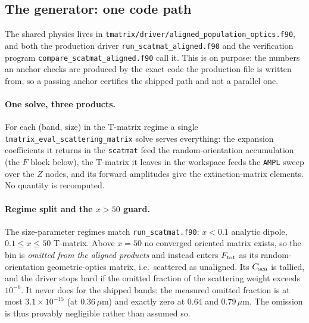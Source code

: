 \documentclass{my_memo}
\newcommand{\code}[1]{\texttt{#1}}
\newcommand{\um}{\ensuremath{\,\mu\mathrm{m}}}
\begin{document}
\subsection{The generator: one code path}\label{sec:aligned:gen}

The shared physics lives in \code{tmatrix/driver/aligned\_population\_optics.f90},
and both the production driver \code{run\_scatmat\_aligned.f90} and the
verification program \code{compare\_scatmat\_aligned.f90} call it. This is on
purpose: the numbers an anchor checks are produced by the exact code the
production file is written from, so a passing anchor certifies the shipped path
and not a parallel one.

\paragraph{One solve, three products.} For each (band, size) in the T-matrix
regime a single \code{tmatrix\_eval\_scattering\_matrix} solve serves everything:
the expansion coefficients it returns in the \code{scatmat} feed the
random-orientation accumulation (the $F$ block below), the T-matrix it leaves in
the workspace feeds the \code{AMPL} sweep over the
$Z$ nodes, and its forward amplitudes give the extinction-matrix elements. No
quantity is recomputed.

\paragraph{Regime split and the $x>50$ guard.} The size-parameter regimes match
\code{run\_scatmat.f90}: $x<0.1$ analytic dipole, $0.1\le x\le50$ T-matrix. Above
$x=50$ no converged oriented matrix exists, so the bin is \emph{omitted from the
aligned products} and instead enters $F_{\rm tot}$ as its random-orientation
geometric-optics matrix, i.e.\ scattered as unaligned. Its $C_{\rm sca}$ is
tallied, and the driver stops hard if the omitted fraction of the scattering
weight exceeds $10^{-6}$. It never does for the shipped bands: the measured
omitted fraction is at most $3.1\times10^{-15}$ (at $0.36\um$) and exactly zero at
$0.64$ and $0.79\um$. The omission is thus provably negligible rather than
assumed so.
\end{document}
